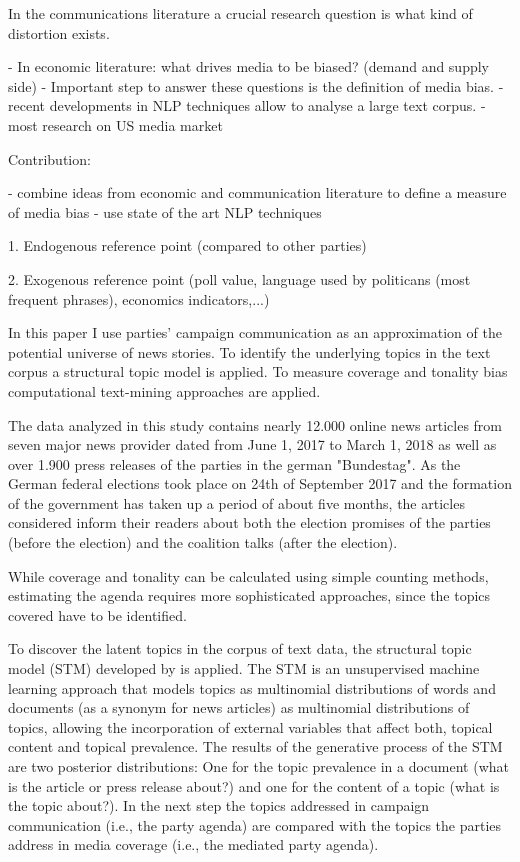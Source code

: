 \documentclass[12pt,a4paper,notitlepage]{article}
\begin{document}
In the communications literature a crucial research question is what kind of distortion exists.  



- In economic literature: what drives media to be biased? (demand and supply side)
- Important step to answer these questions is the definition of media bias. 
- recent developments in NLP techniques allow to analyse a large text corpus. 
- most research on US media market

Contribution:

- combine ideas from economic and communication literature to define a measure of media bias
- use state of the art NLP techniques





1. Endogenous reference point (compared to other parties)

2. Exogenous reference point (poll value, language used by politicans (most frequent phrases), economics indicators,...)


In this paper I use parties' campaign communication as an approximation of the potential universe of news stories. To identify the underlying topics in the text corpus a structural topic model is applied. To measure coverage and tonality bias computational text-mining approaches are applied. 

The data analyzed in this study contains nearly 12.000 online news articles from seven major news provider dated from June 1, 2017 to March 1, 2018 as well as over 1.900 press releases of the parties in the german "Bundestag". As the German federal elections took place on 24th of September 2017 and the formation of the government has taken up a period of about five months, the articles considered inform their readers about both the election promises of the parties (before the election) and the coalition talks (after the election). 

While coverage and tonality can be calculated using simple counting methods, estimating the agenda requires more sophisticated approaches, since the topics covered have to be identified.

To discover the latent topics in the corpus of text data, the structural topic model (STM) developed by \citet{roberts_model_2016} is applied. The STM is an unsupervised machine learning approach that models topics as multinomial distributions of words and documents (as a synonym for news articles) as multinomial distributions of topics, allowing the incorporation of external variables that affect both, topical content and topical prevalence. The results of the generative process of the STM are two posterior distributions: One for the topic prevalence in a document (what is the article or press release about?) and one for the content of a topic (what is the topic about?). In the next step the topics addressed in campaign communication (i.e., the party agenda) are compared with the topics the parties address in media coverage (i.e., the mediated party agenda).
\end{document}
